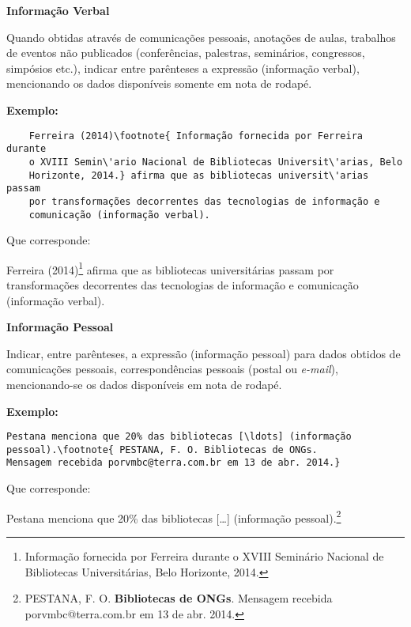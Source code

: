 \textbf{Informação Verbal}

Quando obtidas atrav\'es de comunicações pessoais, anotações de aulas, trabalhos de eventos não publicados (confer\^encias, palestras, semin\'arios, congressos, simpósios etc.), indicar entre par\^enteses a expressão (informação verbal), mencionando os dados disponíveis somente em nota de rodap\'e.

\textbf{Exemplo:}

\begin{alineas}
	\item
	\begin{verbatim}
	Ferreira (2014)\footnote{ Informação fornecida por Ferreira durante 
	o XVIII Semin\'ario Nacional de Bibliotecas Universit\'arias, Belo 
	Horizonte, 2014.} afirma que as bibliotecas universit\'arias passam 
	por transformações decorrentes das tecnologias de informação e 
	comunicação (informação verbal).
	\end{verbatim}
\end{alineas}

Que corresponde:

Ferreira (2014)\footnote{ Informação fornecida por Ferreira durante 
o XVIII Semin\'ario Nacional de Bibliotecas Universit\'arias, Belo Horizonte, 
2014.} afirma que as bibliotecas universit\'arias passam por transformações decorrentes das tecnologias de informação e comunicação (informação verbal).


\textbf{Informação Pessoal}

Indicar, entre par\^enteses, a expressão (informação pessoal) para dados obtidos de comunicações pessoais, correspond\^encias pessoais (postal ou \emph{e-mail}), mencionando-se os dados disponíveis em nota de rodap\'e.

\textbf{Exemplo:}


\begin{alineas}
\item
\begin{verbatim}
Pestana menciona que 20% das bibliotecas [\ldots] (informação 
pessoal).\footnote{ PESTANA, F. O. Bibliotecas de ONGs. 
Mensagem recebida porvmbc@terra.com.br em 13 de abr. 2014.}
\end{verbatim}
\end{alineas}


Que corresponde:

Pestana menciona que 20\% das bibliotecas [\ldots] (informação pessoal).\footnote{ PESTANA, F. O. \textbf{Bibliotecas de ONGs}. Mensagem recebida porvmbc@terra.com.br em 13 de abr. 2014.}\\


